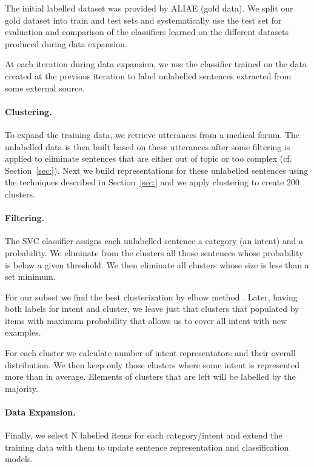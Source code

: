 \documentclass[11pt]{article}
\begin{document}
The initial labelled dataset was provided by ALIAE (gold data). We split our gold dataset into train and test sets and systematically use the test set for evaluation and comparison of the classifiers learned on the different datasets produced during data expansion.

At each iteration during data expansion, we use the classifier trained
on the data created at the previous iteration to label unlabelled
sentences extracted from some external source. 

\paragraph{Clustering.} To expand the training data, we retrieve utterances from a medical forum. The unlabelled data is then built based on these utterances after some filtering is applied to eliminate sentences that are either out of topic or too complex (cf. Section~\ref{sec:}). Next we build representations for these unlabelled sentences using the techniques described in Section~\ref{sec:} and we apply clustering to create 200 clusters. 

\paragraph{Filtering.} The SVC classifier assigns each unlabelled sentence a category (an intent) and a probability. We eliminate from the clusters all those sentences whose probability is below a given threshold. We then eliminate all clusters whose size is less than a set minimum. 

For our subset we find the best clusterization by elbow method \cite{elbow_rule}. Later, having both labels for intent and cluster, we leave just that clusters that populated by items with maximum probability that allows us to cover all intent with new examples.

For each cluster we calculate number of intent representators and their overall distribution. We then keep only those clusters where some intent is represented more than in average. Elements of clusters that are left will be labelled by the majority.


\paragraph{Data Expansion.} Finally, we select N labelled items for each category/intent and extend the training data with them to update sentence representation and classification models.
\end{document}
